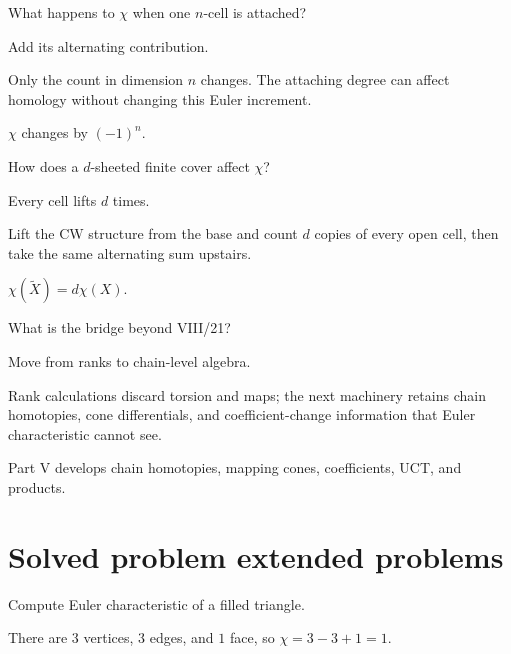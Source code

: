 \begin{exercise}\label{exr:viii21-22}
What happens to \(\chi\) when one \(n\)-cell is attached?
\end{exercise}
\begin{hint}
Add its alternating contribution.

Only the count in dimension \(n\) changes. The attaching degree can affect homology without changing this Euler increment.
\end{hint}
\begin{solution}
\(\chi\) changes by \((-1)^n\).
\end{solution}

\begin{exercise}\label{exr:viii21-23}
How does a \(d\)-sheeted finite cover affect \(\chi\)?
\end{exercise}
\begin{hint}
Every cell lifts \(d\) times.

Lift the CW structure from the base and count \(d\) copies of every open cell, then take the same alternating sum upstairs.
\end{hint}
\begin{solution}
\(\chi(\widetilde X)=d\chi(X)\).
\end{solution}

\begin{exercise}\label{exr:viii21-24}
What is the bridge beyond VIII/21?
\end{exercise}
\begin{hint}
Move from ranks to chain-level algebra.

Rank calculations discard torsion and maps; the next machinery retains chain homotopies, cone differentials, and coefficient-change information that Euler characteristic cannot see.
\end{hint}
\begin{solution}
Part V develops chain homotopies, mapping cones, coefficients, UCT, and products.
\end{solution}


\section{Solved problem extended problems}

\begin{problem}\label{prob:viii21-01}
Compute Euler characteristic of a filled triangle.
\end{problem}
\begin{solution}
There are \(3\) vertices, \(3\) edges, and \(1\) face, so \(\chi=3-3+1=1\).
\end{solution}

